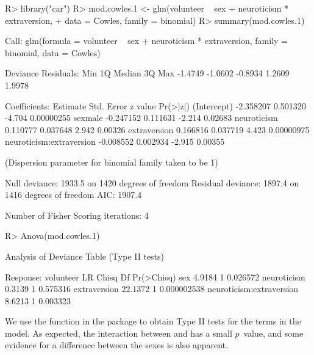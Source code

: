 \documentclass[article]{jss}
\begin{document}
\begin{Schunk}
\begin{Sinput}
R> library("car")
R> mod.cowles.1 <- glm(volunteer ~ sex + neuroticism * extraversion,
+    data = Cowles, family = binomial)
R> summary(mod.cowles.1)
\end{Sinput}
\begin{Soutput}
Call:
glm(formula = volunteer ~ sex + neuroticism * extraversion, family = binomial, 
    data = Cowles)

Deviance Residuals: 
    Min       1Q   Median       3Q      Max  
-1.4749  -1.0602  -0.8934   1.2609   1.9978  

Coefficients:
                          Estimate Std. Error z value   Pr(>|z|)
(Intercept)              -2.358207   0.501320  -4.704 0.00000255
sexmale                  -0.247152   0.111631  -2.214    0.02683
neuroticism               0.110777   0.037648   2.942    0.00326
extraversion              0.166816   0.037719   4.423 0.00000975
neuroticism:extraversion -0.008552   0.002934  -2.915    0.00355

(Dispersion parameter for binomial family taken to be 1)

    Null deviance: 1933.5  on 1420  degrees of freedom
Residual deviance: 1897.4  on 1416  degrees of freedom
AIC: 1907.4

Number of Fisher Scoring iterations: 4
\end{Soutput}
\begin{Sinput}
R> Anova(mod.cowles.1)
\end{Sinput}
\begin{Soutput}
Analysis of Deviance Table (Type II tests)

Response: volunteer
                         LR Chisq Df  Pr(>Chisq)
sex                        4.9184  1    0.026572
neuroticism                0.3139  1    0.575316
extraversion              22.1372  1 0.000002538
neuroticism:extraversion   8.6213  1    0.003323
\end{Soutput}
\end{Schunk}
%
We use the  function in the  package
\citep{FoxWeisberg11} to obtain Type II tests for the terms in the
model.  As expected, the interaction between  and
 has a small $p$~value, and some evidence for a
difference between the sexes is also apparent.
\end{document}
